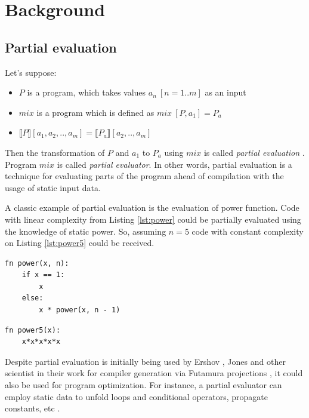 \documentclass[conference]{IEEEtran}
\begin{document}
\section{Background}

\subsection{Partial evaluation}

Let's suppose:

\begin{itemize}
	\item $P$ is a program, which takes values $a_n\ [n=1..m]$ as an input
	\item $mix$ is a program which is defined as $mix\ [P, a_1] = P_a$
	\item $\llbracket P \rrbracket [a_1, a_2, .., a_m] = \llbracket P_a \rrbracket [a_2, .., a_m]$
\end{itemize}
Then the transformation of $P$ and $a_1$ to $P_a$ using $mix$ is called \textit{partial evaluation} \cite{jones1993partial}. Program $mix$ is called \textit{partial evaluator}. In other words, partial evaluation is a technique for evaluating parts of the program ahead of compilation with the usage of static input data.

A classic example of partial evaluation is the evaluation of power function. Code with linear complexity from Listing \ref{lst:power} could be partially evaluated using the knowledge of static power. So, assuming $n = 5$ code with constant complexity on Listing \ref{lst:power5} could be received.

\begin{lstlisting}[caption={Power function before evaluation},label={lst:power}]
fn power(x, n):
	if x == 1:
		x
	else:
		x * power(x, n - 1)
\end{lstlisting}

\begin{lstlisting}[caption={Power function partially evaluation using n = 5},label={lst:power5}]
fn power5(x):
	x*x*x*x*x
\end{lstlisting}


Despite partial evaluation is initially being used by Ershov \cite{ershov1982mixed}, Jones \cite{jones1993partial} and other scientist in their work for compiler generation via Futamura projections \cite{futamura1983partial}, it could also be used for program optimization. For instance, a partial evaluator can employ static data to unfold loops and conditional operators, propagate constants, etc \cite{jones1993partial}. 
\end{document}
